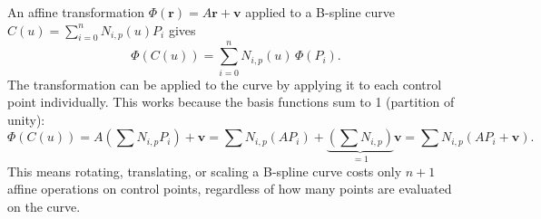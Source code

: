 \begin{remark*}
An affine transformation $\Phi(\mathbf{r}) = A\mathbf{r} + \mathbf{v}$ applied to
a B-spline curve $C(u) = \sum_{i=0}^n N_{i,p}(u) P_i$ gives
\[
  \Phi(C(u)) = \sum_{i=0}^n N_{i,p}(u)\,\Phi(P_i).
\]
The transformation can be applied to the curve by applying it to each
control point individually.
This works because the basis functions sum to 1 (partition of unity):
\[
  \Phi(C(u)) = A\!\left(\sum N_{i,p} P_i\right) + \mathbf{v}
             = \sum N_{i,p} (AP_i) + \underbrace{\left(\sum N_{i,p}\right)}_{=1}\mathbf{v}
             = \sum N_{i,p}(AP_i + \mathbf{v}).
\]
This means rotating, translating, or scaling a B-spline curve costs only
$n+1$ affine operations on control points, regardless of how many points
are evaluated on the curve.
\end{remark*}
